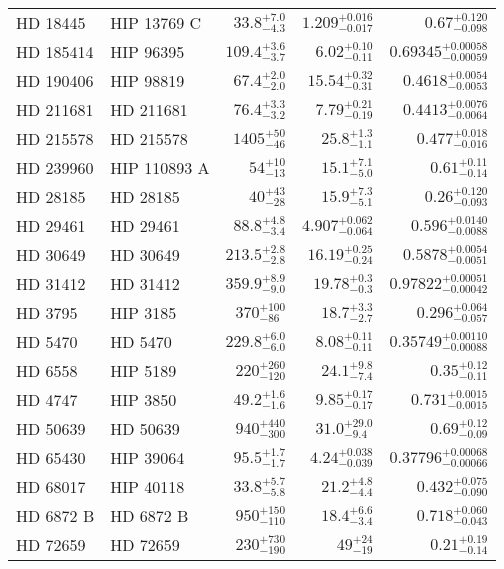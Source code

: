 \begin{longtable*}{llrrr}
HD 18445 & HIP 13769 C & $33.8^{+7.0}_{-4.3}$ & $1.209^{+0.016}_{-0.017}$ & $0.67^{+0.120}_{-0.098}$ \\
HD 185414 & HIP 96395 & $109.4^{+3.6}_{-3.7}$ & $6.02^{+0.10}_{-0.11}$ & $0.69345^{+0.00058}_{-0.00059}$ \\
HD 190406 & HIP 98819 & $67.4^{+2.0}_{-2.0}$ & $15.54^{+0.32}_{-0.31}$ & $0.4618^{+0.0054}_{-0.0053}$ \\
HD 211681 & HD 211681 & $76.4^{+3.3}_{-3.2}$ & $7.79^{+0.21}_{-0.19}$ & $0.4413^{+0.0076}_{-0.0064}$ \\
HD 215578 & HD 215578 & $1405^{+50}_{-46}$ & $25.8^{+1.3}_{-1.1}$ & $0.477^{+0.018}_{-0.016}$ \\
HD 239960 & HIP 110893 A & $54^{+10}_{-13}$ & $15.1^{+7.1}_{-5.0}$ & $0.61^{+0.11}_{-0.14}$ \\
HD 28185 & HD 28185 & $40^{+43}_{-28}$ & $15.9^{+7.3}_{-5.1}$ & $0.26^{+0.120}_{-0.093}$ \\
HD 29461 & HD 29461 & $88.8^{+4.8}_{-3.4}$ & $4.907^{+0.062}_{-0.064}$ & $0.596^{+0.0140}_{-0.0088}$ \\
HD 30649 & HD 30649 & $213.5^{+2.8}_{-2.8}$ & $16.19^{+0.25}_{-0.24}$ & $0.5878^{+0.0054}_{-0.0051}$ \\
HD 31412 & HD 31412 & $359.9^{+8.9}_{-9.0}$ & $19.78^{+0.3}_{-0.3}$ & $0.97822^{+0.00051}_{-0.00042}$ \\
HD 3795 & HIP 3185 & $370^{+100}_{-86}$ & $18.7^{+3.3}_{-2.7}$ & $0.296^{+0.064}_{-0.057}$ \\
HD 5470 & HD 5470 & $229.8^{+6.0}_{-6.0}$ & $8.08^{+0.11}_{-0.11}$ & $0.35749^{+0.00110}_{-0.00088}$ \\
HD 6558 & HIP 5189 & $220^{+260}_{-120}$ & $24.1^{+9.8}_{-7.4}$ & $0.35^{+0.12}_{-0.11}$ \\
HD 4747 & HIP 3850 & $49.2^{+1.6}_{-1.6}$ & $9.85^{+0.17}_{-0.17}$ & $0.731^{+0.0015}_{-0.0015}$ \\
HD 50639 & HD 50639 & $940^{+440}_{-300}$ & $31.0^{+29.0}_{-9.4}$ & $0.69^{+0.12}_{-0.09}$ \\
HD 65430 & HIP 39064 & $95.5^{+1.7}_{-1.7}$ & $4.24^{+0.038}_{-0.039}$ & $0.37796^{+0.00068}_{-0.00066}$ \\
HD 68017 & HIP 40118 & $33.8^{+5.7}_{-5.8}$ & $21.2^{+4.8}_{-4.4}$ & $0.432^{+0.075}_{-0.090}$ \\
HD 6872 B & HD 6872 B & $950^{+150}_{-110}$ & $18.4^{+6.6}_{-3.4}$ & $0.718^{+0.060}_{-0.043}$ \\
HD 72659 & HD 72659 & $230^{+730}_{-190}$ & $49^{+24}_{-19}$ & $0.21^{+0.19}_{-0.14}$ \\

\end{longtable*}

